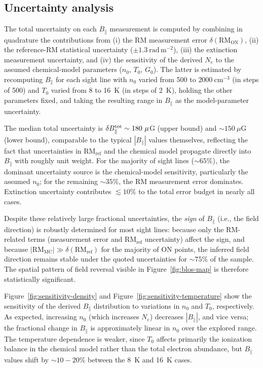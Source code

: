 \documentclass[twocolumn]{aastex631}
\begin{document}
\subsection{Uncertainty analysis}

The total uncertainty on each $B_\parallel$ measurement is computed by combining in quadrature the contributions from (i) the RM measurement error $\delta(\mathrm{RM_{ON}})$, (ii) the reference-RM statistical uncertainty ($\pm 1.3~\mathrm{rad\,m^{-2}}$), (iii) the extinction measurement uncertainty, and (iv) the sensitivity of the derived $N_e$ to the assumed chemical-model parameters ($n_0$, $T_0$, $G_0$). The latter is estimated by recomputing $B_\parallel$ for each sight line with $n_0$ varied from 500 to $2000~\mathrm{cm^{-3}}$ (in steps of 500) and $T_0$ varied from 8 to 16~K (in steps of 2~K), holding the other parameters fixed, and taking the resulting range in $B_\parallel$ as the model-parameter uncertainty.

The median total uncertainty is $\delta B_\parallel^{\rm tot} \sim 180~\mu$G (upper bound) and $\sim 150~\mu$G (lower bound), comparable to the typical $|B_\parallel|$ values themselves, reflecting the fact that uncertainties in $\mathrm{RM_{ref}}$ and the chemical model propagate directly into $B_\parallel$ with roughly unit weight. For the majority of sight lines ($\sim65\%$), the dominant uncertainty source is the chemical-model sensitivity, particularly the assumed $n_0$; for the remaining $\sim35\%$, the RM measurement error dominates. Extinction uncertainty contributes $\lesssim 10\%$ to the total error budget in nearly all cases.

Despite these relatively large fractional uncertainties, the \emph{sign} of $B_\parallel$ (i.e., the field direction) is robustly determined for most sight lines: because only the RM-related terms (measurement error and $\mathrm{RM_{ref}}$ uncertainty) affect the sign, and because $|\mathrm{RM_{MC}}| \gg \delta(\mathrm{RM_{ref}})$ for the majority of ON points, the inferred field direction remains stable under the quoted uncertainties for $\sim75\%$ of the sample. The spatial pattern of field reversal visible in Figure~\ref{fig:blos-map} is therefore statistically significant.

Figure~\ref{fig:sensitivity-density} and Figure~\ref{fig:sensitivity-temperature} show the sensitivity of the derived $B_\parallel$ distribution to variations in $n_0$ and $T_0$, respectively. As expected, increasing $n_0$ (which increases $N_e$) decreases $|B_\parallel|$, and vice versa; the fractional change in $B_\parallel$ is approximately linear in $n_0$ over the explored range. The temperature dependence is weaker, since $T_0$ affects primarily the ionization balance in the chemical model rather than the total electron abundance, but $B_\parallel$ values shift by $\sim10-20\%$ between the 8~K and 16~K cases.
\end{document}
